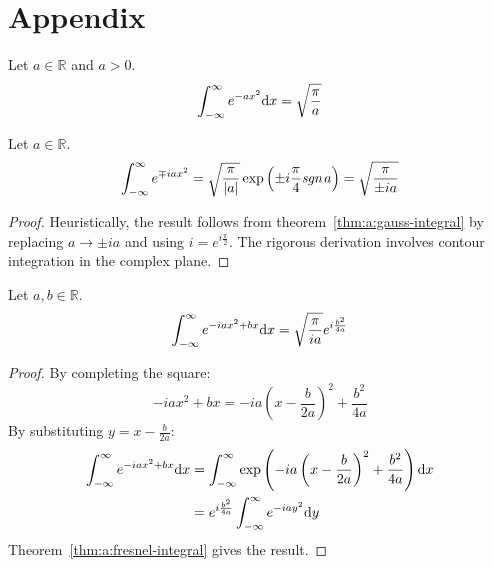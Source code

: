 \documentclass[a4paper]{extarticle}
\begin{document}
\section*{Appendix}

\begin{thm}
  \label{thm:a:gauss-integral}
  Let $a \in \mathbb{R}$ and $a > 0$.
  \begin{equation}
    \label{eqn:a:gauss-integral}
    \int_{-\infty}^{\infty} e^{-ax^2} \text{d}x = \sqrt{\frac{\pi}{a}}
  \end{equation}
\end{thm}

\begin{thm}
  \label{thm:a:fresnel-integral}
  Let $a \in \mathbb{R}$.
  \begin{equation}
    \label{eqn:a:fresnel-integral}
    \int_{-\infty}^{\infty} e^{\mp iax^2}
    = \sqrt{\frac{\pi}{|a|}} \exp\left(\pm i\frac{\pi}{4} \emph{sgn}\,a\right)
    = \sqrt{\frac{\pi}{\pm ia}}
  \end{equation}
  \begin{proof}
    Heuristically, the result follows from theorem~\ref{thm:a:gauss-integral} by
    replacing $a \to \pm ia$ and using $i = e^{i\frac{\pi}{2}}$.
    The rigorous derivation involves contour integration in the complex plane.
  \end{proof}
\end{thm}

\begin{thm}
  \label{thm:a:shifted-fresnel-integral}
  Let $a, b \in \mathbb{R}$.
  \begin{align}
    \label{eqn:a:shifted-fresnel-integral}
    \int_{-\infty}^{\infty} e^{-iax^2 + bx} \text{d}x = \sqrt{\frac{\pi}{ia}} e^{i \frac{b^2}{4a}}
  \end{align}
  \begin{proof}
    By completing the square:
    \begin{equation*}
      -iax^2 + bx = -ia\left(x - \frac{b}{2a}\right)^2 + \frac{b^2}{4a}
    \end{equation*}
    By substituting $y = x - \frac{b}{2a}$:
    \begin{align*}
      \int_{-\infty}^{\infty} e^{-iax^2 + bx} \text{d}x
       & = \int_{-\infty}^{\infty} \exp\left(-ia\left(x - \frac{b}{2a}\right)^2 + \frac{b^2}{4a}\right) \text{d}x \\
       & = e^{i \frac{b^2}{4a}} \int_{-\infty}^{\infty} e^{-iay^2} \text{d}y
    \end{align*}
    Theorem~\ref{thm:a:fresnel-integral} gives the result.
  \end{proof}
\end{thm}
\end{document}
